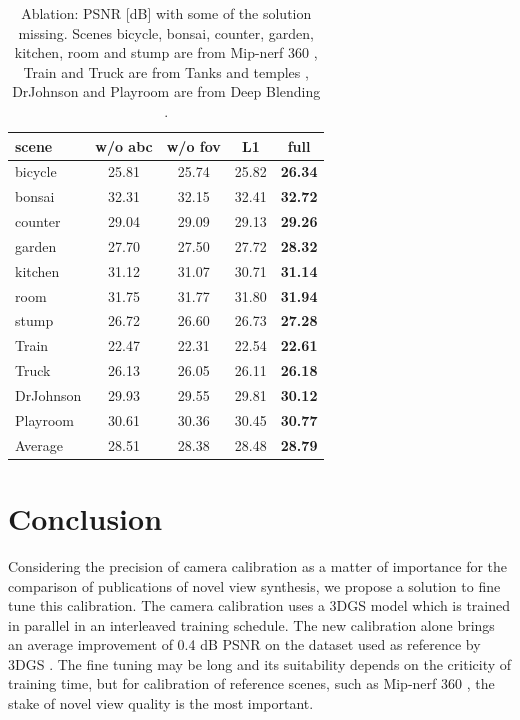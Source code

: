 \documentclass[a4paper,twoside,french]{article}
\begin{document}
\begin{table}[h]
	\begin{center}
	{
	\begin{tabular}{|p{2cm}|c|c|c|c|}
				\hline
				scene & w/o abc & w/o fov & L1 & full \\
				\hline
				bicycle & 25.81 & 25.74 & 25.82 & \textbf{26.34} \\
				bonsai & 32.31 & 32.15 & 32.41 & \textbf{32.72} \\
				counter & 29.04 & 29.09 & 29.13 & \textbf{29.26} \\
				garden & 27.70 & 27.50 & 27.72 & \textbf{28.32} \\
				kitchen & 31.12 & 31.07 & 30.71 & \textbf{31.14} \\
				room & 31.75 & 31.77 & 31.80 & \textbf{31.94} \\
				stump & 26.72 & 26.60 & 26.73 & \textbf{27.28} \\
				Train & 22.47 & 22.31 & 22.54 & \textbf{22.61} \\
				Truck & 26.13 & 26.05 & 26.11 & \textbf{26.18} \\
				DrJohnson & 29.93 & 29.55 & 29.81 & \textbf{30.12} \\
				Playroom & 30.61 & 30.36 & 30.45 & \textbf{30.77} \\
        \hline
        Average & 28.51 & 28.38 & 28.48 & \textbf{28.79} \\
        \hline
			\end{tabular}
	}
	\caption{Ablation: PSNR [dB] with some of the solution missing. Scenes bicycle, bonsai, counter, garden, kitchen, room and stump
  are from Mip-nerf 360 \cite{barron2022mip}, Train and Truck are from Tanks and temples \cite{knapitsch2017tanks}, DrJohnson and
  Playroom are from Deep Blending \cite{HPPFDB18}.}
	\label{table:ablation}
	\end{center}
\end{table}

\section{Conclusion}

Considering the precision of camera calibration as a matter of importance for the comparison of publications of
novel view synthesis, we propose a solution to fine tune this calibration. The camera calibration uses a 
3DGS model which is trained in parallel in an interleaved training schedule.
The new calibration alone brings an average improvement of 0.4 dB PSNR on the dataset used as reference by 3DGS \cite{kerbl20233d}.
The fine tuning may be long and its suitability depends on the criticity of training time, but for calibration
of reference scenes, such as Mip-nerf 360 \cite{barron2022mip}, the stake of novel view quality is the most important.
\clearpage


\end{document}
